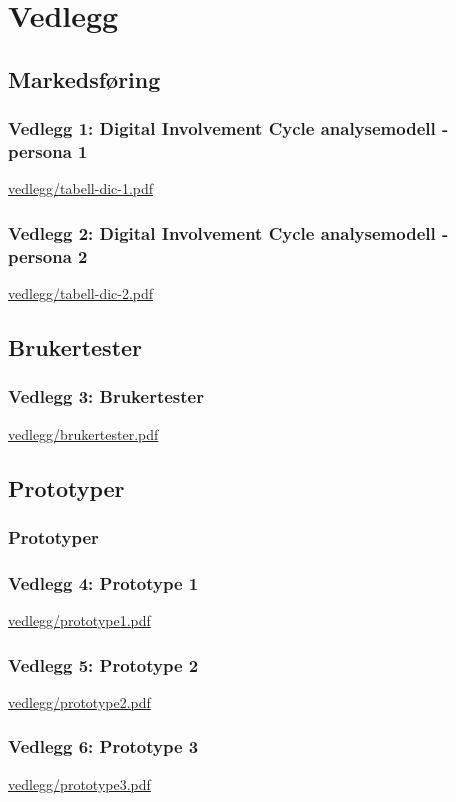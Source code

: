\chapter{Vedlegg}
\label{chap:vedlegg}
\begin{sloppypar}

\section{\textbf{Markedsføring}}
\subsection{\textbf{Vedlegg 1:} Digital Involvement Cycle analysemodell - persona 1}
\label{vedlegg:1}
\url{vedlegg/tabell-dic-1.pdf}

\subsection{\textbf{Vedlegg 2:} Digital Involvement Cycle analysemodell - persona 2}
\label{vedlegg:2}
\url{vedlegg/tabell-dic-2.pdf}

\section{\textbf{Brukertester}}
\subsection{\textbf{Vedlegg 3:} Brukertester}
\label{vedlegg:3}
\url{vedlegg/brukertester.pdf}

\section{\textbf{Prototyper}}
\subsection{\textbf{Prototyper}}
\subsection{\textbf{Vedlegg 4:} Prototype 1}
\url{vedlegg/prototype1.pdf}
\subsection{\textbf{Vedlegg 5:} Prototype 2}
\url{vedlegg/prototype2.pdf}
\subsection{\textbf{Vedlegg 6:} Prototype 3}
\url{vedlegg/prototype3.pdf}
\end{sloppypar}